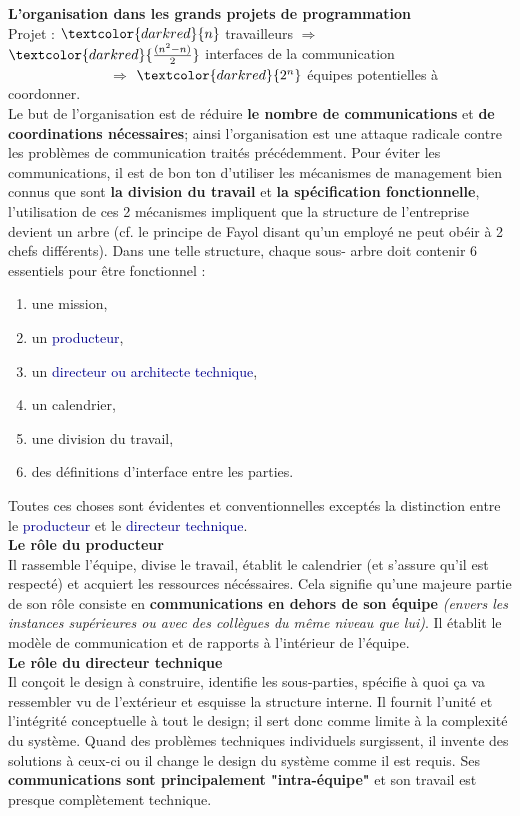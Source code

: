 \documentclass[runningheads]{llncs}
\newcommand{\blu}[1]{\textcolor{darkblue}{#1}}
\newcommand{\red}[1]{\textcolor{darkred}{#1}}
\begin{document}
\noindent\textbf{L'organisation dans les grands projets de programmation} \\
Projet : $\red{n}$ travailleurs $\Rightarrow$ $\red{\frac{(n^2-n)}{2}}$ interfaces de la communication \\ 
\indent $\qquad\qquad\qquad\quad\ \Rightarrow $ $\red{2^n}$ équipes potentielles à coordonner.\\
Le but de l'organisation est de réduire \textbf{le nombre de communications} et \textbf{de coordinations nécessaires}; ainsi 
l'organisation est une attaque radicale contre les problèmes de communication traités précédemment. Pour éviter les 
communications, il est de bon ton d'utiliser les mécanismes de management bien connus que sont \textbf{la division du travail} et
\textbf{la spécification fonctionnelle}, l'utilisation de ces 2 mécanismes impliquent que la structure de l'entreprise devient un
arbre (cf. le principe de Fayol disant qu'un employé ne peut obéir à 2 chefs différents). Dans une telle structure, chaque sous-
arbre doit contenir 6 essentiels pour être fonctionnel :
\begin{enumerate}
\item une mission,
\item un \blu{producteur},
\item un \blu{directeur ou architecte technique},
\item un calendrier,
\item une division du travail,
\item des définitions d'interface entre les parties.
\end{enumerate}
Toutes ces choses sont évidentes et conventionnelles exceptés la distinction entre le \blu{producteur} et le \blu{directeur 
technique}.\\

\noindent\textbf{Le rôle du producteur}\\
Il rassemble l'équipe, divise le travail, établit le calendrier (et s'assure qu'il est respecté) et acquiert les ressources 
nécéssaires. Cela signifie qu'une majeure partie de son rôle consiste en \textbf{communications en dehors de son équipe} 
\textit{(envers les instances supérieures ou avec des collègues du même niveau que lui)}. Il établit le modèle de communication et 
de rapports à l'intérieur de l'équipe.\\

\noindent\textbf{Le rôle du directeur technique}\\
Il conçoit le design à construire, identifie les sous-parties, spécifie à quoi ça va ressembler vu de l'extérieur et esquisse la 
structure interne. Il fournit l'unité et l'intégrité conceptuelle à tout le design; il sert donc comme limite à la complexité du 
système. Quand des problèmes techniques individuels surgissent, il invente des solutions à ceux-ci ou il change le design du 
système comme il est requis. Ses \textbf{communications sont principalement "intra-équipe"} et son travail est presque 
complètement technique.\\
\end{document}

